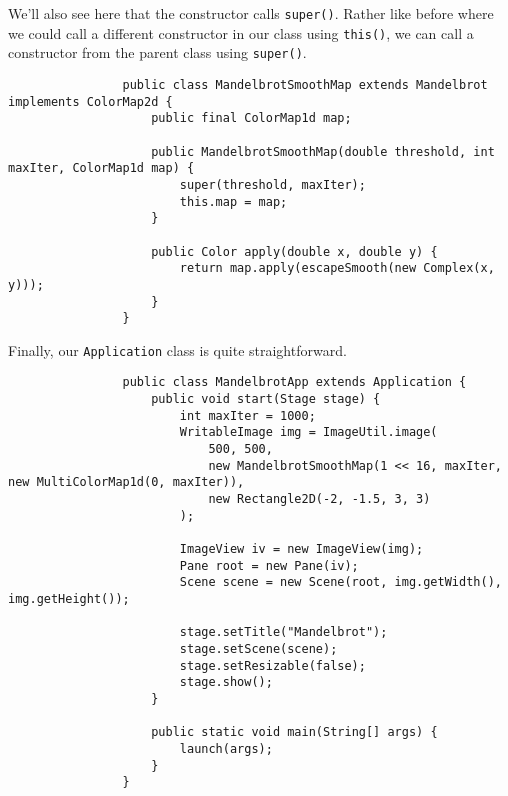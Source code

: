 \documentclass{article}
\begin{document}
            We'll also see here that the constructor calls \texttt{super()}. Rather like before where we could call a different constructor
            in our class using \texttt{this()}, we can call a constructor from the parent class using \texttt{super()}.
        
            \begin{verbatim}            
                public class MandelbrotSmoothMap extends Mandelbrot implements ColorMap2d {
                    public final ColorMap1d map;
    
                    public MandelbrotSmoothMap(double threshold, int maxIter, ColorMap1d map) {
                        super(threshold, maxIter);
                        this.map = map;
                    }
    
                    public Color apply(double x, double y) {
                        return map.apply(escapeSmooth(new Complex(x, y)));
                    }
                }
            \end{verbatim}
            
            Finally, our \texttt{Application} class is quite straightforward.
            
            \begin{verbatim}            
                public class MandelbrotApp extends Application {
                    public void start(Stage stage) {
                        int maxIter = 1000;
                        WritableImage img = ImageUtil.image(
                            500, 500,
                            new MandelbrotSmoothMap(1 << 16, maxIter, new MultiColorMap1d(0, maxIter)),
                            new Rectangle2D(-2, -1.5, 3, 3)
                        );
        
                        ImageView iv = new ImageView(img);
                        Pane root = new Pane(iv);
                        Scene scene = new Scene(root, img.getWidth(), img.getHeight());

                        stage.setTitle("Mandelbrot");
                        stage.setScene(scene);
                        stage.setResizable​(false);
                        stage.show();
                    }

                    public static void main(String[] args) {
                        launch(args);
                    }
                }
            \end{verbatim}
        
\end{document}
